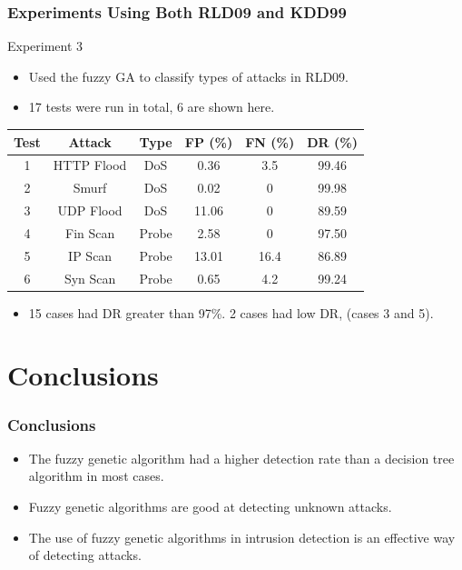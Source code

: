 \documentclass{beamer}
\begin{document}
\begin{frame}
	\frametitle{Experiments Using Both RLD09 and KDD99}
Experiment 3
	\begin{itemize}
		\item Used the fuzzy GA to classify types of attacks in RLD09.
		\item 17 tests were run in total, 6 are shown here.
	\end{itemize}
\begin{table}
\begin{tabular}{cccccc}
Test & Attack & Type & FP (\%) & FN (\%) & DR (\%)\\ \hline
1 & HTTP Flood & DoS & 0.36 & 3.5 & 99.46\\
2 & Smurf & DoS & 0.02 & 0 & 99.98\\
3 & UDP Flood & DoS & 11.06 & 0 & 89.59\\
4 & Fin Scan & Probe & 2.58 & 0 & 97.50\\
5 & IP Scan & Probe & 13.01 & 16.4 & 86.89\\
6 & Syn Scan & Probe & 0.65 & 4.2 & 99.24\\
\end{tabular}
\end{table}

\begin{itemize}
	\item 15 cases had DR greater than 97\%. 2 cases had low DR, (cases 3 and 5).
\end{itemize}

\end{frame}
\section[Conclusions]{Conclusions}

\begin{frame}
\frametitle{Conclusions}
	\begin{itemize}
		\item The fuzzy genetic algorithm had a higher detection rate than a decision tree algorithm in most cases.
		\item Fuzzy genetic algorithms are good at detecting unknown attacks.
		\item The use of fuzzy genetic algorithms in intrusion detection is an effective way of detecting attacks.
	\end{itemize}
\end{frame}
\end{document}
